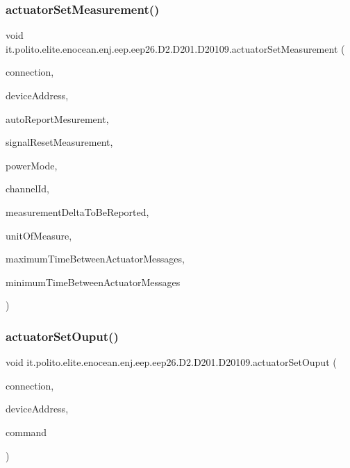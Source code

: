 \subsubsection{\texorpdfstring{actuator\+Set\+Measurement()}{actuatorSetMeasurement()}}
{\footnotesize\ttfamily void it.\+polito.\+elite.\+enocean.\+enj.\+eep.\+eep26.\+D2.\+D201.\+D20109.\+actuator\+Set\+Measurement (\begin{DoxyParamCaption}\item[{\hyperlink{classit_1_1polito_1_1elite_1_1enocean_1_1enj_1_1communication_1_1_en_j_connection}{En\+J\+Connection}}]{connection,  }\item[{byte \mbox{[}$\,$\mbox{]}}]{device\+Address,  }\item[{boolean}]{auto\+Report\+Mesurement,  }\item[{boolean}]{signal\+Reset\+Measurement,  }\item[{boolean}]{power\+Mode,  }\item[{int}]{channel\+Id,  }\item[{int}]{measurement\+Delta\+To\+Be\+Reported,  }\item[{\hyperlink{enumit_1_1polito_1_1elite_1_1enocean_1_1enj_1_1eep_1_1eep26_1_1_d2_1_1_d201_1_1_d201_unit_of_measure}{D201\+Unit\+Of\+Measure}}]{unit\+Of\+Measure,  }\item[{int}]{maximum\+Time\+Between\+Actuator\+Messages,  }\item[{int}]{minimum\+Time\+Between\+Actuator\+Messages }\end{DoxyParamCaption})}

\hypertarget{classit_1_1polito_1_1elite_1_1enocean_1_1enj_1_1eep_1_1eep26_1_1_d2_1_1_d201_1_1_d20109_a41aef8d3541b89f849a1ab256fa8b643}{}\label{classit_1_1polito_1_1elite_1_1enocean_1_1enj_1_1eep_1_1eep26_1_1_d2_1_1_d201_1_1_d20109_a41aef8d3541b89f849a1ab256fa8b643} 
\subsubsection{\texorpdfstring{actuator\+Set\+Ouput()}{actuatorSetOuput()}\hspace{0.1cm}{\footnotesize\ttfamily [1/2]}}
{\footnotesize\ttfamily void it.\+polito.\+elite.\+enocean.\+enj.\+eep.\+eep26.\+D2.\+D201.\+D20109.\+actuator\+Set\+Ouput (\begin{DoxyParamCaption}\item[{\hyperlink{classit_1_1polito_1_1elite_1_1enocean_1_1enj_1_1communication_1_1_en_j_connection}{En\+J\+Connection}}]{connection,  }\item[{byte \mbox{[}$\,$\mbox{]}}]{device\+Address,  }\item[{boolean}]{command }\end{DoxyParamCaption})}

